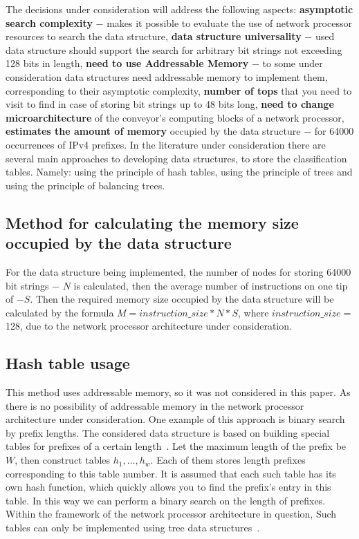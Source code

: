 \documentclass[conference]{IEEEtran}
\begin{document}
        The decisions under consideration will address the following aspects:
        {\bf asymptotic search complexity} $-$ makes it possible to evaluate the use of 
        network processor resources to search the data structure,
        {\bf data structure universality} $-$ used data structure
        should support the search for arbitrary bit strings not exceeding 128 bits in length,
        {\bf need to use Addressable Memory} $-$ to some under consideration 
        data structures need addressable memory to implement them, 
        corresponding to their asymptotic complexity,
        {\bf number of tops} that you need to visit to find
        in case of storing bit strings up to 48 bits long,
        {\bf need to change microarchitecture} of the conveyor's computing blocks 
        of a network processor,
        {\bf estimates the amount of memory} occupied by the data structure $-$ for 64000 occurrences of IPv4 prefixes.
        In the literature under consideration there are several main approaches to developing data structures, 
        to store the classification tables. Namely: using the principle of hash tables, using the principle of trees 
        and using the principle of balancing trees.

    \subsection{Method for calculating the memory size occupied by the data structure}
        For the data structure being implemented, the number of nodes for storing
        64000 bit strings $-$ $N$ is calculated, then the average number of instructions on 
        one tip of $-$$S$. Then the required memory size occupied by the data structure 
        will be calculated by the formula $M = instruction\_size * N * S$,
        where $instruction\_size = $128, due to the network processor architecture under consideration.

    \subsection{Hash table usage}
        This method uses addressable memory, so it was not considered in this paper. 
        As there is no possibility of addressable memory in the network processor architecture under consideration.
        One example of this approach is binary search by prefix lengths.
        The considered data structure is based on building special tables for prefixes of a certain length~\cite{mun2006binary}. 
        Let the maximum length of the prefix be {\ttfamily $W$}, then construct tables {\ttfamily $h_{1},\ldots,h_{w}$}. 
        Each of them stores length prefixes corresponding to this table number. 
        It is assumed that each such table has its own hash function, 
        which quickly allows you to find the prefix's entry in this table.
        In this way we can perform a binary search on the length of prefixes. 
        Within the framework of the network processor architecture in question, 
        Such tables can only be implemented using tree data structures~\cite{mun2006binary}. 
\end{document}
